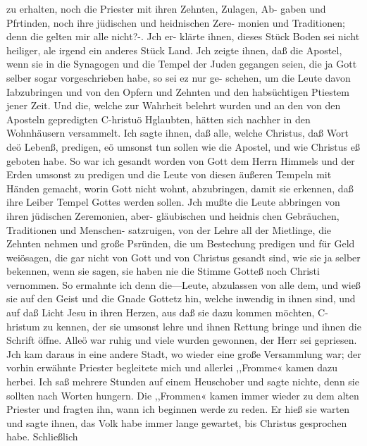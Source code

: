 zu erhalten, noch die Priester mit ihren Zehnten, Zulagen, Ab-
gaben und Pfrtinden, noch ihre jüdischen und heidnischen Zere-
monien und Traditionen; denn die gelten mir alle nicht?-. Jch er-
klärte ihnen, dieses Stück Boden sei nicht heiliger, ale irgend ein
anderes Stück Land. Jch zeigte ihnen, daß die Apostel, wenn
sie in die Synagogen und die Tempel der Juden gegangen seien,
die ja Gott selber sogar vorgeschrieben habe, so sei ez nur ge-
schehen, um die Leute davon Iabzubringen und von den Opfern
und Zehnten und den habsüchtigen Ptiestem jener Zeit. Und
die, welche zur Wahrheit belehrt wurden und an den von den
Aposteln gepredigten C-hristuö Hglaubten, hätten sich nachher in
den Wohnhäusern versammelt. Ich sagte ihnen, daß alle, welche
Christus, daß Wort deö Lebenß, predigen, eö umsonst tun sollen
wie die Apostel, und wie Christus eß geboten habe. So war ich
gesandt worden von Gott dem Herrn Himmels und der Erden
umsonst zu predigen und die Leute von diesen äußeren Tempeln
mit Händen gemacht, worin Gott nicht wohnt, abzubringen, damit
sie erkennen, daß ihre Leiber Tempel Gottes werden sollen. Jch
mußte die Leute abbringen von ihren jüdischen Zeremonien, aber-
gläubischen und heidnis chen Gebräuchen, Traditionen und Menschen-
satzruigen, von der Lehre all der Mietlinge, die Zehnten nehmen
und große Psründen, die um Bestechung predigen und für Geld
weiösagen, die gar nicht von Gott und von Christus gesandt
sind, wie sie ja selber bekennen, wenn sie sagen, sie haben nie
die Stimme Gotteß noch Christi vernommen. So ermahnte ich
denn die—Leute, abzulassen von alle dem, und wieß sie auf den
Geist und die Gnade Gottetz hin, welche inwendig in ihnen sind,
und auf daß Licht Jesu in ihren Herzen, aus daß sie dazu kommen
möchten, C-hristum zu kennen, der sie umsonst lehre und ihnen
Rettung bringe und ihnen die Schrift öffne. Alleö war ruhig
und viele wurden gewonnen, der Herr sei gepriesen.
Jch kam daraus in eine andere Stadt, wo wieder eine große
Versammlung war; der vorhin erwähnte Priester begleitete mich
und allerlei ,,Fromme« kamen dazu herbei. Ich saß mehrere
Stunden auf einem Heuschober und sagte nichte, denn sie sollten
nach Worten hungern. Die ,,Frommen« kamen immer wieder
zu dem alten Priester und fragten ihn, wann ich beginnen werde
zu reden. Er hieß sie warten und sagte ihnen, das Volk habe
immer lange gewartet, bis Christus gesprochen habe. Schließlich


